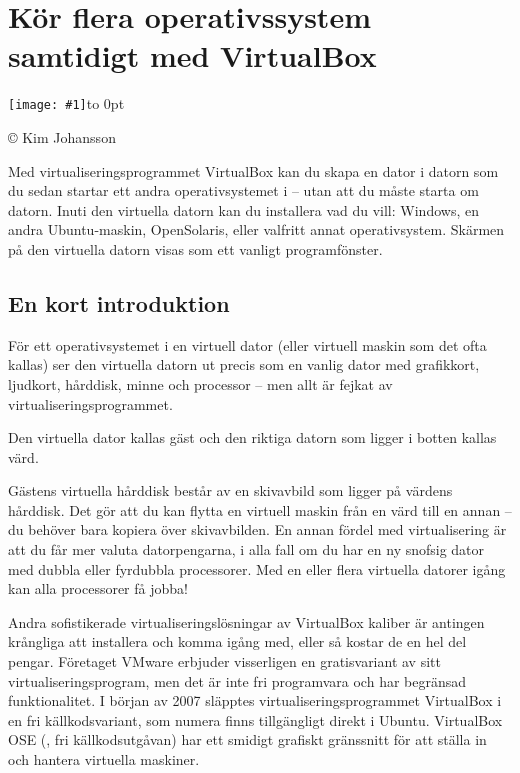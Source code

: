 \documentclass[a4paper,final]{memoir} %
\newcommand{\xrcredit}[1]{\hbox to 0pt{\hspace*{.6\baselineskip}\begin{rotate}{90}{\usefont{T1}{phv}{m}{n}\selectfont\tiny #1}\end{rotate}}}
\newcommand\xintropic[1]{{\texttt{[image: \#1]}\xrcredit{\copyright{} Kim Johansson}}\medskip}
\newcommand\xchapter[2]{\chapter{#2}\begin{center}\xintropic{#1}\end{center}}
\begin{document}

\xchapter{bilder804-all/Kor_flera_OS_Virtualbox}{Kör flera operativssystem samtidigt med VirtualBox}\label{cha:virtualbox}



Med virtualiseringsprogrammet VirtualBox kan du skapa en dator i datorn som du sedan startar ett andra operativsystemet i -- utan att du måste starta om datorn. Inuti den virtuella datorn kan du installera vad du vill: Windows, en andra Ubuntu-maskin, OpenSolaris, eller valfritt annat operativsystem. Skärmen på den virtuella datorn visas som ett vanligt programfönster.


\section{En kort introduktion}


För ett operativsystemet i en virtuell dator (eller virtuell maskin som det ofta kallas) ser den virtuella datorn ut precis som en vanlig dator med grafikkort, ljudkort, hårddisk, minne och processor -- men allt är fejkat av virtualiseringsprogrammet. 

Den virtuella dator kallas gäst och den riktiga datorn som ligger i botten kallas värd.

Gästens virtuella hårddisk består av en skivavbild som ligger på värdens hårddisk. Det gör att du kan flytta en virtuell maskin från en värd till en annan -- du behöver bara kopiera över skivavbilden. En annan fördel med virtualisering är att du får mer valuta datorpengarna, i alla fall om du har en ny snofsig dator med dubbla eller fyrdubbla processorer. Med en eller flera virtuella datorer igång kan alla processorer få jobba!

Andra sofistikerade virtualiseringslösningar av VirtualBox kaliber är antingen krångliga att installera och komma igång med, eller så kostar de en hel del pengar. Företaget VMware erbjuder visserligen en gratisvariant av sitt virtualiseringsprogram, men det är inte fri programvara och har begränsad funktionalitet. I början av 2007 släpptes virtualiseringsprogrammet VirtualBox i en fri källkodsvariant, som numera finns tillgängligt direkt i Ubuntu. VirtualBox OSE (, fri källkodsutgåvan) har ett smidigt grafiskt gränssnitt för att ställa in och hantera virtuella maskiner.
\end{document}
